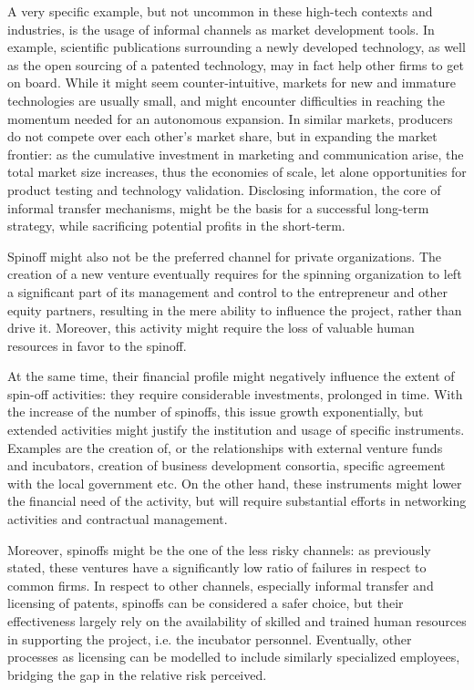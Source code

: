 A very specific example, but not uncommon in these high-tech contexts and industries, is the usage of informal channels as market development tools. In example, scientific publications surrounding a newly developed technology, as well as the open sourcing of a patented technology, may in fact help other firms to get on board. While it might seem counter-intuitive, markets for new and immature technologies are usually small, and might encounter difficulties in reaching the momentum needed for an autonomous expansion. In similar markets, producers do not compete over each other's market share, but in expanding the market frontier: as the cumulative investment in marketing and communication arise, the total market size increases, thus the economies of scale, let alone opportunities for product testing and technology validation. Disclosing information, the core of informal transfer mechanisms, might be the basis for a successful long-term strategy, while sacrificing potential profits in the short-term.

Spinoff might also not be the preferred channel for private organizations. The creation of a new venture eventually requires for the spinning organization to left a significant part of its management and control to the entrepreneur and other equity partners, resulting in the mere ability to influence the project, rather than drive it. Moreover, this activity might require the loss of valuable human resources in favor to the spinoff. 

At the same time, their financial profile might negatively influence the extent of spin-off activities: they require considerable investments, prolonged in time. With the increase of the number of spinoffs, this issue growth exponentially, but extended activities might justify the institution and usage of specific instruments. Examples are the creation of, or the relationships with external venture funds and incubators, creation of business development consortia, specific agreement with the local government etc. On the other hand, these instruments might lower the financial need of the activity, but will require substantial efforts in networking activities and contractual management.

Moreover, spinoffs might be the one of the less risky channels: as previously stated, these ventures have a significantly low ratio of failures in respect to common firms. In respect to other channels, especially informal transfer and licensing of patents, spinoffs can be considered a safer choice, but their effectiveness largely rely on the availability of skilled and trained human resources in supporting the project, i.e. the incubator personnel. Eventually, other processes as licensing can be modelled to include similarly specialized employees, bridging the gap in the relative risk perceived.

